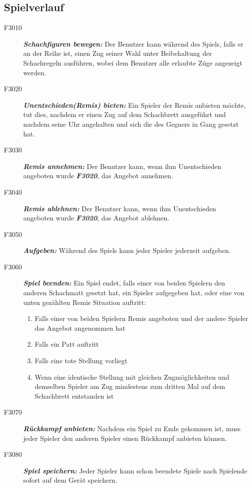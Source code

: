 \documentclass[parskip=full]{scrartcl}
\begin{document}
\subsection{Spielverlauf} 
\begin{description}
	\item[F3010]\textbf{\textit{Schachfiguren bewegen: }}Der Benutzer kann während des Spiels, falls er an der Reihe ist, einen Zug seiner Wahl unter Beibehaltung der Schachregeln ausführen, wobei dem Benutzer alle erlaubte Züge  angezeigt werden.
	\item[F3020] \textbf{\textit{Unentschieden(Remis) bieten: }} Ein Spieler der Remis anbieten möchte, tut dies, nachdem er einen Zug auf dem Schachbrett ausgeführt und nachdem seine Uhr angehalten und sich die des Gegners in Gang gesetzt hat.
	\item[F3030] \textbf{\textit{Remis annehmen: }} Der Benutzer kann, wenn ihm Unentschieden angeboten wurde \textbf{\textit{F3020}}, das Angebot annehmen.
	
	\item[F3040] \textbf{\textit{Remis ablehnen: }} Der Benutzer kann, wenn ihm Unentschieden angeboten wurde \textbf{\textit{F3020}}, das Angebot ablehnen.
	
	\item[F3050] \textbf{\textit{Aufgeben: }} Während des Spiels kann jeder Spieler jederzeit aufgeben.
	
	\item[F3060] \textbf{\textit{Spiel beenden: }} Ein Spiel endet, falls einer von beiden Spielern den anderen Schachmatt gesetzt hat, ein Spieler aufgegeben hat, oder eine von unten gezählten Remis Situation auftritt:
	\begin{enumerate}	    
		\item Falls einer von beiden Spielern Remis angeboten und der andere Spieler das Angebot angenommen hat
		\item Falls ein Patt auftritt
		\item Falls eine tote Stellung vorliegt
		\item Wenn eine identische Stellung mit gleichen Zugmöglichkeiten und demselben Spieler am Zug mindestens zum dritten Mal auf dem Schachbrett entstanden ist 
	\end{enumerate}
	\item[F3070] \textbf{\textit{Rückkampf anbieten: }} Nachdem ein Spiel zu Ende gekommen ist, muss jeder Spieler den anderen Spieler einen Rückkampf anbieten können.		
	\item[F3080] \textbf{\textit{Spiel speichern: }}  Jeder Spieler kann schon beendete Spiele nach Spielende sofort auf dem Gerät speichern. 
\end{description}
\end{document}
